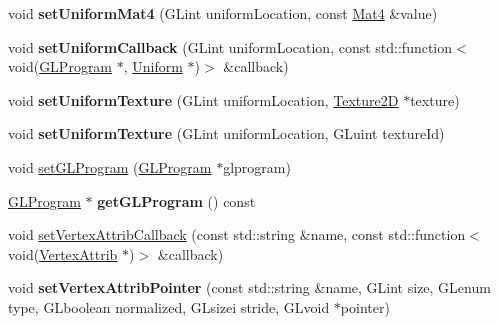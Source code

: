 \begin{DoxyCompactItemize}
\item 
\mbox{\label{classGLProgramState_a88c2777ee39a1e1f5e7c66dd4bd0ac80}} 
void {\bfseries set\+Uniform\+Mat4} (G\+Lint uniform\+Location, const \hyperlink{classMat4}{Mat4} \&value)
\item 
\mbox{\label{classGLProgramState_a80ea832a228428b50f96a2780a7ce82d}} 
void {\bfseries set\+Uniform\+Callback} (G\+Lint uniform\+Location, const std\+::function$<$ void(\hyperlink{classGLProgram}{G\+L\+Program} $\ast$, \hyperlink{structUniform}{Uniform} $\ast$)$>$ \&callback)
\item 
\mbox{\label{classGLProgramState_a0714ac1d8d04e5da63082a4a51e3fc43}} 
void {\bfseries set\+Uniform\+Texture} (G\+Lint uniform\+Location, \hyperlink{classTexture2D}{Texture2D} $\ast$texture)
\item 
\mbox{\label{classGLProgramState_a0213b590caf9dda34371ce2c1fa2bf83}} 
void {\bfseries set\+Uniform\+Texture} (G\+Lint uniform\+Location, G\+Luint texture\+Id)
\end{DoxyCompactItemize}

\textbf{ }\par
\begin{DoxyCompactItemize}
\item 
void \hyperlink{classGLProgramState_a38a364bb0ad6f5ccae97e689dd02011e}{set\+G\+L\+Program} (\hyperlink{classGLProgram}{G\+L\+Program} $\ast$glprogram)
\item 
\mbox{\label{classGLProgramState_a1b6d4947980d7b82313a9a6e0d6894c2}} 
\hyperlink{classGLProgram}{G\+L\+Program} $\ast$ {\bfseries get\+G\+L\+Program} () const
\end{DoxyCompactItemize}

\textbf{ }\par
\begin{DoxyCompactItemize}
\item 
void \hyperlink{classGLProgramState_a2b0daf0548df92f03a1c42807f5aaab0}{set\+Vertex\+Attrib\+Callback} (const std\+::string \&name, const std\+::function$<$ void(\hyperlink{structVertexAttrib}{Vertex\+Attrib} $\ast$)$>$ \&callback)
\item 
\mbox{\label{classGLProgramState_a0e9bd5f54d62ad8f278ff2d698e013fa}} 
void {\bfseries set\+Vertex\+Attrib\+Pointer} (const std\+::string \&name, G\+Lint size, G\+Lenum type, G\+Lboolean normalized, G\+Lsizei stride, G\+Lvoid $\ast$pointer)
\end{DoxyCompactItemize}

